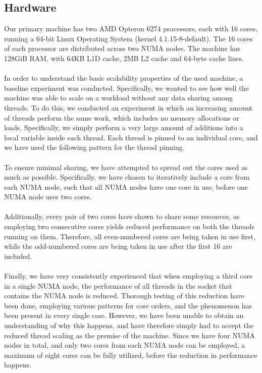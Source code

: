 \documentclass[11pt]{report} %
\begin{document}
\subsection{Hardware}
\label{subsec:hardware}
Our primary machine has two AMD Opteron 6274 processors, each with 16 cores, running a 64-bit Linux Operating System (kernel 4.1.15-8-default). The 16 cores of each processor are distributed across two NUMA nodes. The machine has 128GiB RAM, with 64KB L1D cache, 2MB L2 cache and 64-byte cache lines. \\
\\
In order to understand the basic scalability properties of the used machine, a baseline experiment was conducted. Specifically, we wanted to see how well the machine was able to scale on a workload without any data sharing among threads. To do this, we conducted an experiment in which an increasing amount of threads perform the same work, which includes no memory allocations or loads. Specifically, we simply perform a very large amount of additions into a local variable inside each thread. Each thread is pinned to an individual core, and we have used the following pattern for the thread pinning. \\
\\
To ensure minimal sharing, we have attempted to spread out the cores used as much as possible. Specifically, we have chosen to iteratively include a core from each NUMA node, such that all NUMA nodes have one core in use, before one NUMA node uses two cores. \\
\\
Additionally, every pair of two cores have shown to share some resources, as employing two consecutive cores yields reduced performance on both the threads running on them. Therefore, all even-numbered cores are being taken in use first, while the odd-numbered cores are being taken in use after the first 16 are included.\\
\\
Finally, we have very consistently experienced that when employing a third core in a single NUMA node, the performance of all threads in the socket that contains the NUMA node is reduced. Thorough testing of this reduction have been done, employing various patterns for core orders, and the phenomenon has been present in every single case. However, we have been unable to obtain an understanding of why this happens, and have therefore simply had to accept the reduced thread scaling as the premise of the machine. Since we have four NUMA nodes in total, and only two cores from each NUMA node can be employed, a maximum of eight cores can be fully utilized, before the reduction in performance happens.\\
\end{document}
